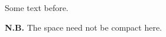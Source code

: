 \documentclass{article}
\begin{document}
Some text before.

{\bf N.B.} The space need not be compact here.
\end{document}

